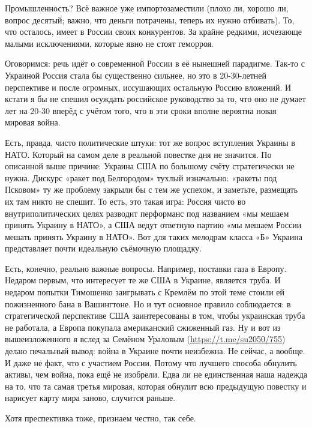 Промышленность? Всё важное уже импортозаместили (плохо ли, хорошо ли, вопрос
десятый; важно, что деньги потрачены, теперь их нужно отбивать). То, что
осталось, имеет в России своих конкурентов. За крайне редкими, исчезающе малыми
исключениями, которые явно не стоят геморроя.

Оговоримся: речь идёт о современной России в её нынешней парадигме. Так-то с
Украиной Россия стала бы существенно сильнее, но это в 20-30-летней перспективе
и после огромных, иссушающих остальную Россию вложений. И кстати я бы не спешил
осуждать российское руководство за то, что оно не думает лет на 20-30 вперёд с
учётом того, что в эти сроки вполне вероятна новая мировая война.

Есть, правда, чисто политические штуки: тот же вопрос вступления Украины в
НАТО. Который на самом деле в реальной повестке дня не значится. По описанной
выше причине: Украина США по большому счёту стратегически не нужна. Дискурс
«ракет под Белгородом» тухлый изначально: «ракеты под Псковом» ту же проблему
закрыли бы с тем же успехом, и заметьте, размещать их там никто не спешит. То
есть, это такая игра: Россия чисто во внутриполитических целях разводит
перформанс под названием «мы мешаем принять Украину в НАТО», а США ведут
ответную партию «мы мешаем России мешать принять Украину в НАТО». Вот для таких
мелодрам класса «Б» Украина представляет почти идеальную съёмочную площадку. 

Есть, конечно, реально важные вопросы. Например, поставки газа в Европу.
Недаром первым, что интересует те же США в Украине, является труба. И недаром
попытки Тимошенко заигрывать с Кремлём по этой теме стоили ей пожизненного бана
в Вашингтоне. Но и тут основное правило соблюдается: в стратегической
перспективе США заинтересованы в том, чтобы украинская труба не работала, а
Европа покупала американский сжиженный газ.  Ну и вот из вышеизложенного я
вслед за Семёном Ураловым (\url{https://t.me/su2050/755}) делаю печальный вывод:
война в Украине почти неизбежна. Не сейчас, а вообще. И даже не факт, что с
участием России. Потому что лучшего способа обнулить активы, чем война, пока
ещё не изобрели. Едва ли не единственная наша надежда на то, что та самая
третья мировая, которая обнулит всю предыдущую повестку и нарисует карту мира
заново, случится раньше.

Хотя преспективка тоже, признаем честно, так себе.
